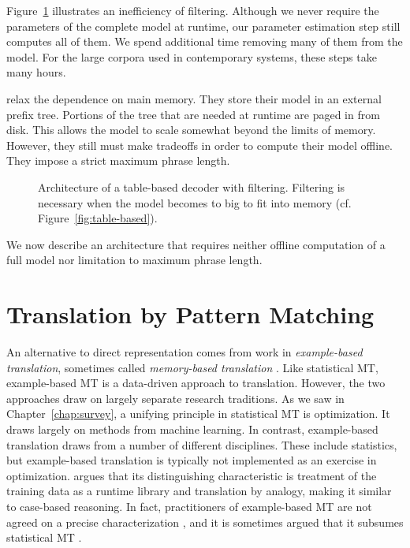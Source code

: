 Figure~\ref{fig:filtering} illustrates an inefficiency of filtering.
Although we never require the parameters of the complete model at runtime, 
our parameter estimation step still computes all of them.  
We spend additional time removing many 
of them from the model.  For the large corpora
used in contemporary systems, these steps take many hours.

\citet{Zens:2007:hlt-naacl} relax the
dependence on main memory.  They store their model
in an external prefix tree.  Portions of the tree that are 
needed at runtime are paged in from disk.
This allows the model to scale somewhat beyond the limits of memory.
However, they still must make tradeoffs in order to compute their
model offline.  They impose a strict maximum phrase length.

\figpreamble
\begin{figure}
	\figfontsize{
	\begin{center}
		
	\end{center}}
	\figpostamble
	\caption[Architecture of a table-based decoder with filtering.]{Architecture of a table-based decoder with filtering.  
	Filtering is necessary when the model becomes to big to fit into memory 
	(cf. Figure~\ref{fig:table-based}).}\label{fig:filtering}
\end{figure}


We now describe an architecture that requires neither offline computation
of a full model nor limitation to maximum phrase length.


\section{Translation by Pattern Matching}\label{sec:tbpm}

An alternative to direct representation
comes from work in {\em example-based translation}, sometimes called
{\em memory-based translation} \citep{Nagao:1984:ahi,Sato:1990:coling,Somers:2003:raebmt}.  
Like statistical MT, example-based MT
is a data-driven approach to translation.  However, the two approaches
draw on largely separate research traditions.  As we saw in Chapter~\ref{chap:survey},
a unifying principle in statistical MT is optimization.
It draws largely on methods from machine learning.  In contrast, example-based
translation draws from a number of different disciplines.  These include
statistics, but example-based translation is typically not implemented as 
an exercise in optimization.  \citet{Wu:2005:mtjournal} argues
that its distinguishing characteristic is
treatment of the training data as a runtime library and translation by
analogy, making it similar to case-based reasoning.  In fact,
practitioners of example-based MT are not agreed on a precise characterization 
\citep{Hutchins:2005:mtsummit}, and it is sometimes argued that it subsumes
statistical MT \citep{Somers:2003:raebmt}.

